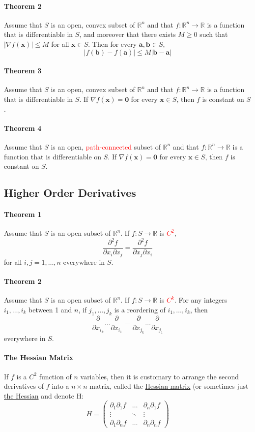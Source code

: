 \documentclass[11pt]{article}
\newcommand{\tb}[1]{\textbf{#1}}
\newcommand{\real}[0]{\mathbb{R}}
\newcommand{\under}[1]{\underline{#1}}
\newcommand{\vx}[0]{\tb{x}}
\newcommand{\vo}[0]{\tb{0}}
\newcommand{\va}[0]{\tb{a}}
\newcommand{\vb}[0]{\tb{b}}
\newcommand{\p}[0]{\partial}
\begin{document}
\paragraph{Theorem 2} Assume that $S$ is an open, convex subset of $\real^n$ and that $f: \real^n \rightarrow \real$ is a function that is differentiable in $S$, and moreover that there exists $M \geq 0$ such that $|\nabla f(\vx)| \leq M$ for all $\vx \in S$. Then for every $\va, \vb \in S$,
$$|f(\vb) - f(\va)| \leq M|\vb - \va|$$
\paragraph{Theorem 3} Assume that $S$ is an open, convex subset of $\real^n$ and that $f: \real^n \rightarrow \real$ is a function that is differentiable in $S$. If $\nabla f(\vx) = \vo$ for every $\vx \in S$, then $f$ is constant on $S$.

\paragraph{Theorem 4} Assume that $S$ is an open, \textcolor{red}{path-connected} subset of $\real^n$ and that $f: \real^n \rightarrow \real$ is a function that is differentiable on $S$. If $\nabla f(\vx) = \vo$ for every $\vx \in S$, then $f$ is constant on $S$.

\subsection{Higher Order Derivatives}
\paragraph{Theorem 1} Assume that $S$ is an open subset of $\real^n$. If $f: S \rightarrow \real$ is \textcolor{red}{$C^2$},
$$\frac{\p^2 f}{\p x_i\p x_j} = \frac{\p^2 f}{\p x_j \p x_i}$$
for all $i,j = 1, \hdots, n$ everywhere in $S$.
\paragraph{Theorem 2} Assume that $S$ is an open subset of $\real^n$. If $f: S \rightarrow \real$ is \textcolor{red}{$C^k$}. For any integers $i_1, \hdots, i_k$ between 1 and $n$, if $j_1, \hdots, j_k$ is a reordering of $i_1, \hdots, i_k$, then
$$\frac{\p}{\p x_{i_k}}\hdots\frac{\p}{\p x_{i_1}} = \frac{\p}{\p x_{j_k}}\hdots\frac{\p}{\p x_{j_1}}$$
everywhere in $S$.
\paragraph{The Hessian Matrix} If $f$ is a $C^2$ function of $n$ variables, then it is customary to arrange the second derivatives of $f$ into a $n \times n$ matrix, called the \under{Hessian matrix} (or sometimes just \under{the Hessian} and denote H:
$$H = \begin{pmatrix}
	\p_1\p_1 f &\hdots &\p_n\p_1 f\\
	\vdots &\ddots &\vdots \\
	\p_1\p_n f &\hdots &\p_n\p_n f
\end{pmatrix}$$
\end{document}
